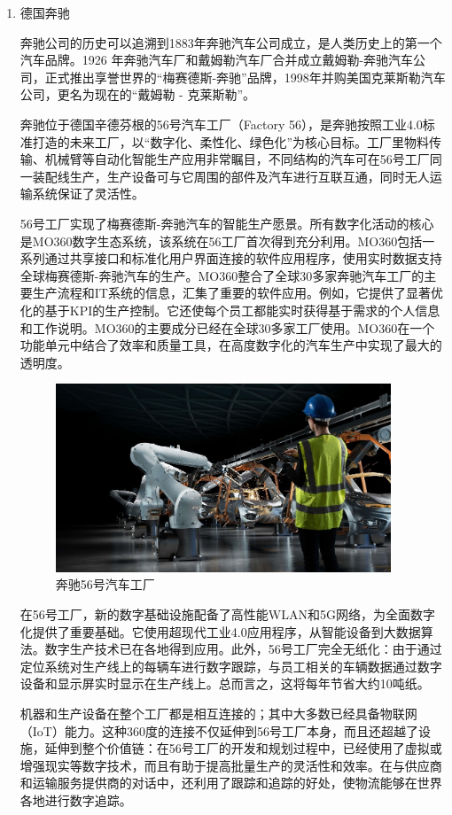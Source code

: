 \documentclass[lang=cn,12pt,bibtex,newtx,twoside,margintrue,citestyle=gb7714-2015, bibstyle=gb7714-2015]{elegantbook}
\begin{document}
\begin{enumerate}
\item 德国奔驰
\label{sec:org5916215}

奔驰公司的历史可以追溯到1883年奔驰汽车公司成立，是人类历史上的第一个汽车品牌。1926 年奔驰汽车厂和戴姆勒汽车厂合并成立戴姆勒-奔驰汽车公司，正式推出享誉世界的“梅赛德斯-奔驰”品牌，1998年并购美国克莱斯勒汽车公司，更名为现在的“戴姆勒 - 克莱斯勒”。

奔驰位于德国辛德芬根的56号汽车工厂（Factory 56），是奔驰按照工业4.0标准打造的未来工厂，以“数字化、柔性化、绿色化”为核心目标。工厂里物料传输、机械臂等自动化智能生产应用非常瞩目，不同结构的汽车可在56号工厂同一装配线生产，生产设备可与它周围的部件及汽车进行互联互通，同时无人运输系统保证了灵活性。

56号工厂实现了梅赛德斯-奔驰汽车的智能生产愿景。所有数字化活动的核心是MO360数字生态系统，该系统在56工厂首次得到充分利用。MO360包括一系列通过共享接口和标准化用户界面连接的软件应用程序，使用实时数据支持全球梅赛德斯-奔驰汽车的生产。MO360整合了全球30多家奔驰汽车工厂的主要生产流程和IT系统的信息，汇集了重要的软件应用。例如，它提供了显著优化的基于KPI的生产控制。它还使每个员工都能实时获得基于需求的个人信息和工作说明。MO360的主要成分已经在全球30多家工厂使用。MO360在一个功能单元中结合了效率和质量工具，在高度数字化的汽车生产中实现了最大的透明度。

\begin{figure}[htbp]
\centering
\includegraphics[angle=0,width=10cm]{./figure/4.6.jpg}
\caption{\label{4.6}奔驰56号汽车工厂}
\end{figure}


在56号工厂，新的数字基础设施配备了高性能WLAN和5G网络，为全面数字化提供了重要基础。它使用超现代工业4.0应用程序，从智能设备到大数据算法。数字生产技术已在各地得到应用。此外，56号工厂完全无纸化：由于通过定位系统对生产线上的每辆车进行数字跟踪，与员工相关的车辆数据通过数字设备和显示屏实时显示在生产线上。总而言之，这将每年节省大约10吨纸。

机器和生产设备在整个工厂都是相互连接的；其中大多数已经具备物联网（IoT）能力。这种360度的连接不仅延伸到56号工厂本身，而且还超越了设施，延伸到整个价值链：在56号工厂的开发和规划过程中，已经使用了虚拟或增强现实等数字技术，而且有助于提高批量生产的灵活性和效率。在与供应商和运输服务提供商的对话中，还利用了跟踪和追踪的好处，使物流能够在世界各地进行数字追踪。



\end{enumerate}
\end{document}
